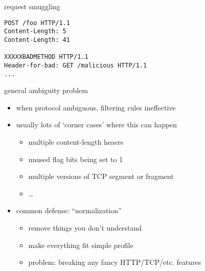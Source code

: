 
\begin{frame}[fragile]{request smuggling}
\begin{Verbatim}[fontsize=\small]
POST /foo HTTP/1.1
Content-Length: 5
Content-Length: 41

XXXXXBADMETHOD HTTP/1.1
Header-for-bad: GET /malicious HTTP/1.1
...
\end{Verbatim}
\end{frame}

\begin{frame}{general ambiguity problem}
\begin{itemize}
\item when protocol ambiguous, filtering rules ineffective
\item usually lots of `corner cases' where this can happen
    \begin{itemize}
    \item multiple content-length heaers
    \item unused flag bits being set to 1
    \item multiple versions of TCP segment or fragment
    \item \ldots
    \end{itemize}
\item common defense: ``normalization''
    \begin{itemize}
    \item remove things you don't understand
    \item make everything fit simple profile
    \item problem: breaking any fancy HTTP/TCP/etc. features
    \end{itemize}
\end{itemize}
\end{frame}

